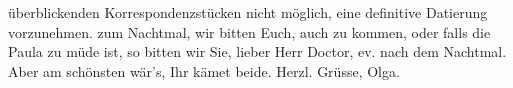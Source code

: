 \begin{ledgroupsized}[t]{13cm}
{{{                  überblickenden Korrespondenzstücken nicht möglich, eine definitive Datierung
                  vorzunehmen.}}}\label{K_L02560-1h} zum Nachtmal, wir bitten Euch, auch zu kommen, oder falls die
                  Paula zu müde ist, so bitten wir Sie, lieber
               Herr Doctor, ev. nach dem Nachtmal. Aber am schönsten wär’s, Ihr kämet beide. Herzl.
               Grüsse,\pend
           \pstart \spacefill\mbox{Olga.}\pend{}          \endnumbering{}\end{ledgroupsized}  \newcommand{\dateiname}{L02560}\newcommand{\titel}{Olga Schnitzler an Richard und Paula Beer-Hofmann, [15. 12. 1909?]}\newcommand{\editorInnen}{Martin Anton Müller und Gerd-Hermann Susen}
            \footnotesize
\begin{ledgroupsized}[t]{11.5cm}
\end{ledgroupsized}
         
      